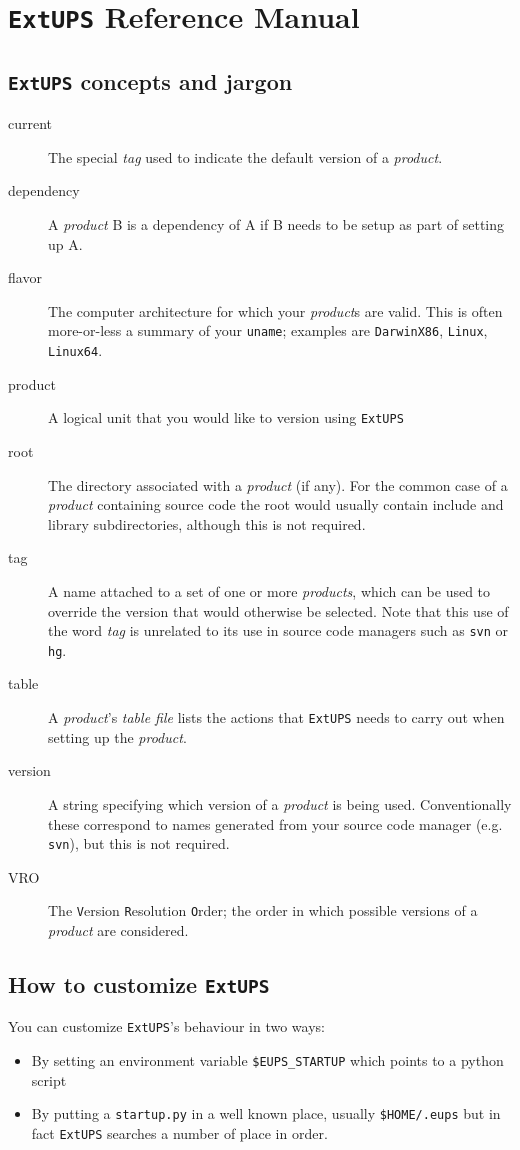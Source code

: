 \documentclass{article}
\newcommand{\code}[1]{\texttt{#1}}
\newcommand{\file}[1]{\texttt{#1}}
\newcommand{\eups}{\code{ExtUPS}}
\begin{document}
\section{\eups{} Reference Manual}

\subsection{\eups{} concepts and jargon}

\begin{description}
\item[current]
  The special \textit{tag} used to indicate the default version of a \textit{product}.
\item[dependency]
  A \textit{product} B is a dependency of A if B needs to be setup as part of setting up A.
\item[flavor]
  The computer architecture for which your \textit{product}s are valid.  This is often more-or-less
  a summary of your \code{uname}; examples are \code{DarwinX86}, \code{Linux}, \code{Linux64}.
\item[product]
  A logical unit that you would like to version using \eups{}
\item[root]
  The directory associated with a \textit{product} (if any).  For the common case of
  a \textit{product} containing source code the root would usually contain include and library subdirectories,
  although this is not required.
\item[tag]
  A name attached to a set of one or more \textit{products}, which can be used to override the version
  that would otherwise be selected.  Note that this use of the word \textit{tag} is unrelated to its use
  in source code managers such as \code{svn} or \code{hg}.
\item[table]
  A \textit{product}'s \textit{table file} lists the actions that \eups{}
  needs to carry out when setting up the \textit{product}.
\item[version]
  A string specifying which version of a \textit{product} is being used.  Conventionally these correspond to names
  generated from your source code manager (e.g. \code{svn}), but this is not required.
\item[VRO]
  The \code{V}ersion \code{R}esolution \code{O}rder;  the order in which possible versions of
  a \textit{product} are considered.
\end{description}

\subsection{How to customize \eups{}}
\label{customization}
You can customize \eups's behaviour in two ways:
\begin{itemize}
\item By setting an environment variable \code{\$EUPS\_STARTUP} which points to a python script
\item By putting a \file{startup.py} in a well known place, usually \file{\$HOME/.eups} but in fact \eups{}
  searches a number of place in order.
\end{itemize}
\end{document}
